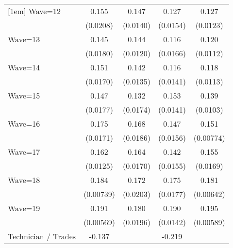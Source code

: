 {\begin{tabular}{l*{4}{c}}
[1em]
Wave=12             &       0.155\sym{***}&       0.147\sym{***}&       0.127\sym{***}&       0.127\sym{***}\\
                    &    (0.0208)         &    (0.0140)         &    (0.0154)         &    (0.0123)         \\
[1em]
Wave=13             &       0.145\sym{***}&       0.144\sym{***}&       0.116\sym{***}&       0.120\sym{***}\\
                    &    (0.0180)         &    (0.0120)         &    (0.0166)         &    (0.0112)         \\
[1em]
Wave=14             &       0.151\sym{***}&       0.142\sym{***}&       0.116\sym{***}&       0.118\sym{***}\\
                    &    (0.0170)         &    (0.0135)         &    (0.0141)         &    (0.0113)         \\
[1em]
Wave=15             &       0.147\sym{***}&       0.132\sym{***}&       0.153\sym{***}&       0.139\sym{***}\\
                    &    (0.0177)         &    (0.0174)         &    (0.0141)         &    (0.0103)         \\
[1em]
Wave=16             &       0.175\sym{***}&       0.168\sym{***}&       0.147\sym{***}&       0.151\sym{***}\\
                    &    (0.0171)         &    (0.0186)         &    (0.0156)         &   (0.00774)         \\
[1em]
Wave=17             &       0.162\sym{***}&       0.164\sym{***}&       0.142\sym{***}&       0.155\sym{***}\\
                    &    (0.0125)         &    (0.0170)         &    (0.0155)         &    (0.0169)         \\
[1em]
Wave=18             &       0.184\sym{***}&       0.172\sym{***}&       0.175\sym{***}&       0.181\sym{***}\\
                    &   (0.00739)         &    (0.0203)         &    (0.0177)         &   (0.00642)         \\
[1em]
Wave=19             &       0.191\sym{***}&       0.180\sym{***}&       0.190\sym{***}&       0.195\sym{***}\\
                    &   (0.00569)         &    (0.0196)         &    (0.0142)         &   (0.00589)         \\
[1em]
Technician / Trades &      -0.137\sym{***}&                     &      -0.219\sym{***}&                     \\

\end{tabular}}
